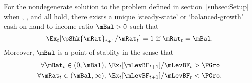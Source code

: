 \begin{theorem}  \label{thm:balance} \label{thm:MSSBalExists}
 For the nondegenerate solution to the problem defined in section~\ref{subsec:Setup} when {\FVAC}, {\WRIC}, and {\GIC} all hold, there exists a unique `steady-state' or `balanced-growth' cash-on-hand-to-income ratio $\mBal>0$ such that
  \begin{equation}
    \Ex_t [\pShk{\mRat}_{t+1}/\mRat_t] = 1 \mbox{~if~} \mRat_t = \mBal.
    \label{eq:mTarget}
  \end{equation}
  Moreover, $\mBal$ is a point of stablity in the sense that
  \begin{align}\label{eq:stability}
    \forall {\mRat}_t\in(0,\mBal),      \,\,& \Ex_{t}[\mLevBF_{t+1}]/\mLevBF_{t} > \PGro \\
    \forall {\mRat}_t\in(\mBal,\infty), \,\,& \Ex_{t}[\mLevBF_{t+1}]/\mLevBF_{t} < \PGro. \notag
  \end{align}
\end{theorem}
